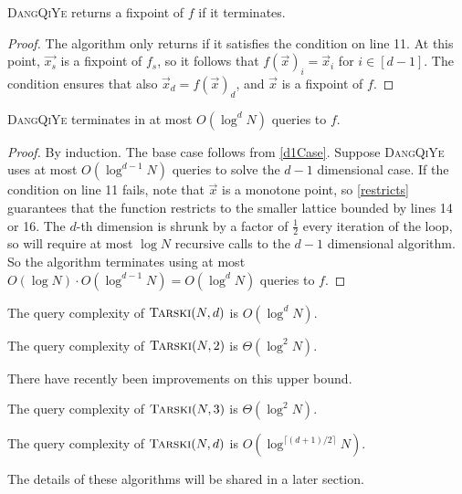 \begin{lemma}
  \textsc{DangQiYe} returns a fixpoint of $f$ if it terminates.
\end{lemma}
\begin{proof}
  The algorithm only returns if it satisfies the condition on line 11. At this point, $\vec{x_s}$ is a fixpoint
  of $f_s$, so it follows that $f(\vec{x})_i = \vec{x}_i$ for $i \in [d-1]$. The condition ensures
  that also $\vec{x}_d = f(\vec{x})_d$, and $\vec{x}$ is a fixpoint of $f$.
\end{proof}
\begin{lemma}
  \textsc{DangQiYe} terminates in at most $O(\log^d N)$ queries to $f$.
\end{lemma}
\begin{proof}
  By induction. The base case follows from \cref{d1Case}. Suppose \textsc{DangQiYe} uses at most
  $O(\log^{d-1}N)$ queries to solve the $d-1$ dimensional case. If the condition
  on line 11 fails, note that $\vec{x}$ is a monotone point, so \cref{restricts} guarantees
  that the function restricts to the smaller lattice bounded by lines 14 or 16.
  The $d$-th dimension is shrunk by a factor of $\frac{1}{2}$ every iteration of the loop,
  so will require at most $\log N$ recursive calls to the $d-1$ dimensional algorithm.
  So the algorithm terminates using at most $O(\log N) \cdot O(\log^{d-1} N) = O(\log^d N)$ queries to $f$.
\end{proof}
\begin{theorem}
  The query complexity of $\textsc{Tarski}(N, d)$ is $O(\log^d N)$.
\end{theorem}
\begin{cor}
  The query complexity of $\textsc{Tarski}(N, 2)$ is $\Theta(\log^2 N)$.
\end{cor}
There have recently been improvements on this upper bound.
\begin{theorem}
  The query complexity of $\textsc{Tarski}(N, 3)$ is $\Theta(\log^2 N)$.
\end{theorem}
\begin{theorem}
  The query complexity of $\textsc{Tarski}(N, d)$ is $O(\log^{\lceil (d+1)/2 \rceil} N)$.
\end{theorem}
The details of these algorithms will be shared in a later section.

